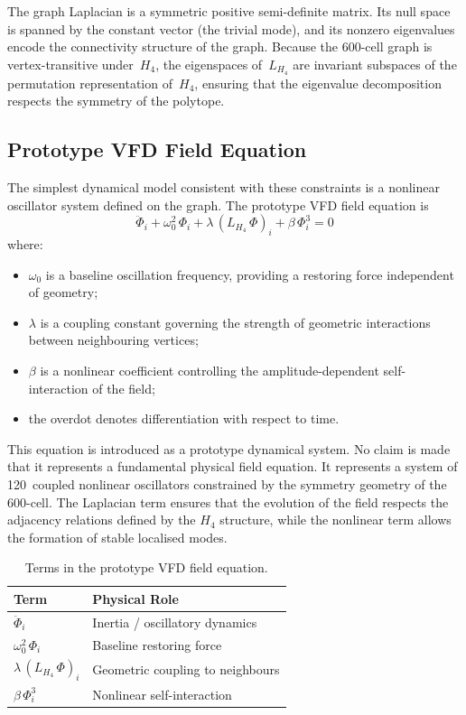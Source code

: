 \documentclass[12pt,a4paper]{article}
\newcommand{\Hfour}{H_4}
\newcommand{\Lmat}{L_{H_4}}
\begin{document}
The graph Laplacian is a symmetric positive semi-definite matrix.  Its null
space is spanned by the constant vector (the trivial mode), and its nonzero
eigenvalues encode the connectivity structure of the graph.  Because the
600-cell graph is vertex-transitive under~$\Hfour$, the eigenspaces
of~$\Lmat$ are invariant subspaces of the permutation representation
of~$\Hfour$, ensuring that the eigenvalue decomposition respects the symmetry
of the polytope.

\subsection{Prototype VFD Field Equation}

The simplest dynamical model consistent with these constraints is a nonlinear
oscillator system defined on the graph.  The prototype VFD field equation is
\begin{equation}\label{eq:vfd}
  \boxed{\ddot{\Phi}_i
    + \omega_0^2\,\Phi_i
    + \lambda\,(\Lmat\,\Phi)_i
    + \beta\,\Phi_i^3 = 0}
\end{equation}
where:
\begin{itemize}[nosep]
  \item $\omega_0$ is a baseline oscillation frequency, providing a restoring
    force independent of geometry;
  \item $\lambda$ is a coupling constant governing the strength of geometric
    interactions between neighbouring vertices;
  \item $\beta$ is a nonlinear coefficient controlling the amplitude-dependent
    self-interaction of the field;
  \item the overdot denotes differentiation with respect to time.
\end{itemize}

This equation is introduced as a prototype dynamical system.  No claim
is made that it represents a fundamental physical field equation.  It
represents a system of 120~coupled nonlinear oscillators constrained by
the symmetry geometry of the 600-cell.  The Laplacian term
ensures that the evolution of the field respects the adjacency relations
defined by the $\Hfour$ structure, while the nonlinear term allows the
formation of stable localised modes.

\begin{table}[H]
\centering
\caption{Terms in the prototype VFD field equation.}
\label{tab:terms}
\begin{tabular}{@{}ll@{}}
\toprule
Term & Physical Role \\
\midrule
$\ddot{\Phi}_i$ & Inertia / oscillatory dynamics \\
$\omega_0^2\,\Phi_i$ & Baseline restoring force \\
$\lambda\,(\Lmat\,\Phi)_i$ & Geometric coupling to neighbours \\
$\beta\,\Phi_i^3$ & Nonlinear self-interaction \\
\bottomrule
\end{tabular}
\end{table}
\end{document}
